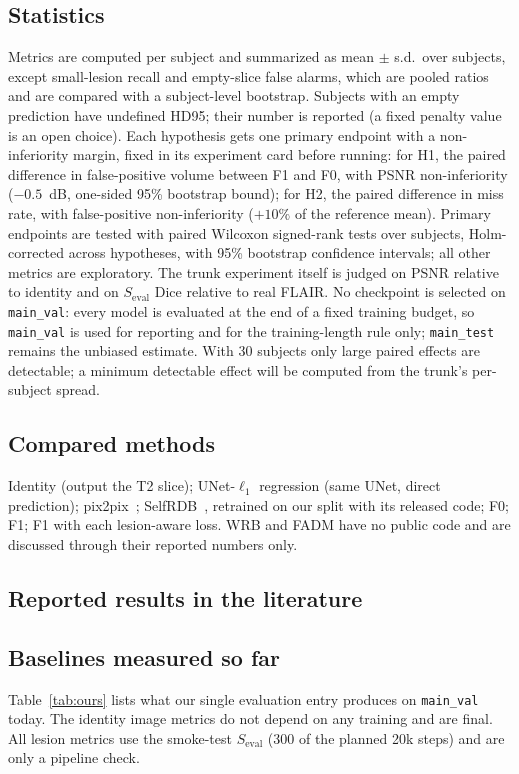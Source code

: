 \documentclass[journal]{IEEEtran}
\newcommand{\Seval}{S_{\mathrm{eval}}}
\begin{document}
\subsection{Statistics}
Metrics are computed per subject and summarized as mean $\pm$ s.d.\ over subjects, except small-lesion recall and
empty-slice false alarms, which are pooled ratios and are compared with a subject-level bootstrap. Subjects with an empty
prediction have undefined HD95; their number is reported (a fixed penalty value is an open choice). Each hypothesis gets one
primary endpoint with a non-inferiority margin, fixed in its experiment card before running: for H1, the paired difference
in false-positive volume between F1 and F0, with PSNR non-inferiority ($-0.5$~dB, one-sided 95\% bootstrap bound); for H2, the paired difference in miss rate, with false-positive non-inferiority ($+10\%$ of the reference mean). Primary endpoints are tested with paired Wilcoxon
signed-rank tests over subjects, Holm-corrected across hypotheses, with 95\% bootstrap confidence intervals; all other
metrics are exploratory. The trunk experiment itself is judged on PSNR relative to identity and on $\Seval$ Dice relative to
real FLAIR. No checkpoint is selected on \texttt{main\_val}: every model is evaluated at the end of a fixed training budget, so \texttt{main\_val} is used for reporting and for the training-length rule only; \texttt{main\_test} remains the unbiased estimate. With 30 subjects only large paired effects are detectable; a minimum detectable effect will be
computed from the trunk's per-subject spread.

\subsection{Compared methods}
Identity (output the T2 slice); UNet-$\ell_1$ regression (same UNet, direct prediction); pix2pix~\cite{isola2017pix2pix};
SelfRDB~\cite{arslan2025selfrdb}, retrained on our split with its released code; F0; F1; F1 with each lesion-aware loss.
WRB and FADM have no public code and are discussed through their reported numbers only.

\subsection{Reported results in the literature}
\label{sec:lit}


\subsection{Baselines measured so far}
Table~\ref{tab:ours} lists what our single evaluation entry produces on \texttt{main\_val} today. The identity image metrics
do not depend on any training and are final. All lesion metrics use the smoke-test $\Seval$ (300 of the planned 20k steps)
and are only a pipeline check.
\end{document}
